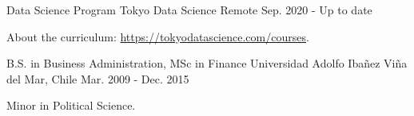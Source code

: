 

\begin{cventries}


  \cventry
    {Data Science Program} %
    {Tokyo Data Science} %
    {Remote} %
    {Sep. 2020 - Up to date} %
    {
      \begin{cvitems} %
        \item {About the curriculum: \href{https://tokyodatascience.com/courses}{https://tokyodatascience.com/courses}.}
      \end{cvitems}
    }
    
  \cventry
    {B.S. in Business Administration, MSc in Finance} %
    {Universidad Adolfo Ibañez} %
    {Viña del Mar, Chile} %
    {Mar. 2009 - Dec. 2015} %
    {
      \begin{cvitems} %
        \item {Minor in Political Science.}
      \end{cvitems}
    }

\end{cventries}